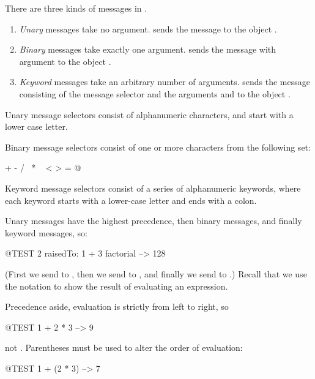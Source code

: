 \documentclass[a4paper,10pt,twoside]{book}
\begin{document}
There are three kinds of messages in \pharo.
\begin{enumerate}
  \item \emph{Unary} messages take no argument.
   sends the message  to the object .
  \item \emph{Binary} messages take exactly one argument.
  	 sends the message \ct{+} with argument  to the object .
  \item \emph{Keyword} messages take an arbitrary number of arguments.
  	 sends the message consisting of the message selector
	 and the arguments  and  to the object .
\end{enumerate}

Unary message selectors consist of alphanumeric characters, and start with a lower case letter.

Binary message selectors consist of one or more characters from the following set:
\begin{code}{}
+ - / \ * ~ < > = @ %
\end{code}
\noindent
Keyword message selectors consist of a series of alphanumeric keywords, where each keyword starts with a lower-case letter and ends with a colon.

Unary messages have the highest precedence, then binary messages, and finally keyword messages, so:
\begin{code}{@TEST}
2 raisedTo: 1 + 3 factorial --> 128
\end{code}
(First we send  to , then we send  to , and finally we send  to .)  
Recall that we use the notation \ct{-->} to show the result of evaluating an expression.

Precedence aside, evaluation is strictly from left to right, so
\begin{code}{@TEST}
1 + 2 * 3 --> 9
\end{code}
not .
Parentheses must be used to alter the order of evaluation:
\begin{code}{@TEST}
1 + (2 * 3) --> 7
\end{code}
\end{document}
